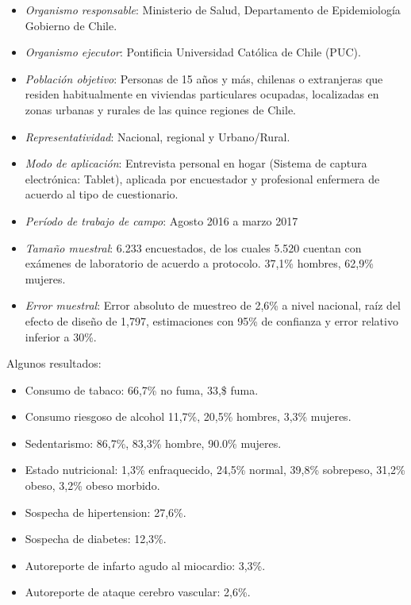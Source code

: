\documentclass[]{book}
\providecommand{\tightlist}{%
  \setlength{\itemsep}{0pt}\setlength{\parskip}{0pt}}
\begin{document}
\begin{itemize}
\tightlist
\item
  \emph{Organismo responsable}: Ministerio de Salud, Departamento de Epidemiología\\
  Gobierno de Chile.\\
\item
  \emph{Organismo ejecutor}: Pontificia Universidad Católica de Chile (PUC).\\
\item
  \emph{Población objetivo}: Personas de 15 años y más, chilenas o extranjeras que residen habitualmente en viviendas particulares ocupadas, localizadas en zonas urbanas y rurales de las quince regiones de Chile.\\
\item
  \emph{Representatividad}: Nacional, regional y Urbano/Rural.\\
\item
  \emph{Modo de aplicación}: Entrevista personal en hogar (Sistema de captura electrónica: Tablet), aplicada por encuestador y profesional enfermera de acuerdo al tipo de cuestionario.\\
\item
  \emph{Período de trabajo de campo}: Agosto 2016 a marzo 2017\\
\item
  \emph{Tamaño muestral}: 6.233 encuestados, de los cuales 5.520 cuentan con exámenes de laboratorio de acuerdo a protocolo. 37,1\% hombres, 62,9\% mujeres.\\
\item
  \emph{Error muestral}: Error absoluto de muestreo de 2,6\% a nivel nacional, raíz del efecto de diseño de 1,797, estimaciones con 95\% de confianza y error relativo inferior a 30\%.
\end{itemize}

Algunos resultados:

\begin{itemize}
\tightlist
\item
  Consumo de tabaco: 66,7\% no fuma, 33,\$ fuma.
\item
  Consumo riesgoso de alcohol 11,7\%, 20,5\% hombres, 3,3\% mujeres.
\item
  Sedentarismo: 86,7\%, 83,3\% hombre, 90.0\% mujeres.
\item
  Estado nutricional: 1,3\% enfraquecido, 24,5\% normal, 39,8\% sobrepeso, 31,2\% obeso, 3,2\% obeso morbido.
\item
  Sospecha de hipertension: 27,6\%.
\item
  Sospecha de diabetes: 12,3\%.
\item
  Autoreporte de infarto agudo al miocardio: 3,3\%.
\item
  Autoreporte de ataque cerebro vascular: 2,6\%.
\end{itemize}
\end{document}
